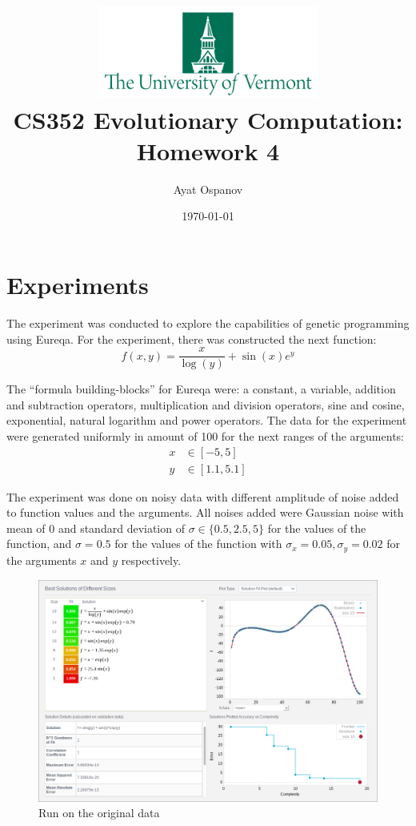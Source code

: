 \documentclass[12pt]{article}
\title{\includegraphics[height=3cm]{pics/UVM.png} \\
    CS352 Evolutionary Computation: Homework 4}
\author{Ayat Ospanov}
\date{\today}
\begin{document}
\maketitle

\section{Experiments}\label{sec:experiments}

    The experiment was conducted to explore the capabilities of genetic programming
    using Eureqa. For the experiment, there was constructed the next function:
    $$f(x, y) = \frac{x}{\log(y)} + \sin(x)e^y$$

    The ``formula building-blocks'' for Eureqa were: a constant, a variable,
    addition and subtraction operators, multiplication and division operators,
    sine and cosine, exponential, natural logarithm and power operators. The
    data for the experiment were generated uniformly in amount of 100 for the
    next ranges of the arguments:
    \begin{align*}
        x &\in [-5, 5] \\
        y &\in [1.1, 5.1]
    \end{align*}

    The experiment was done on noisy data with different amplitude of noise added
    to function values and the arguments. All noises added were Gaussian noise
    with mean of 0 and standard deviation of $\sigma \in \{0.5, 2.5, 5\}$ for the
    values of the function, and $\sigma = 0.5$ for the values of the function
    with $\sigma_x = 0.05, \sigma_y = 0.02$ for the arguments $x$ and $y$ respectively.

    \begin{figure}[H]
        \centering
        \includegraphics[width=\linewidth]{pics/sol_0.png}
        \caption{Run on the original data}
        \label{fig:noiseless}
    \end{figure}
\end{document}

